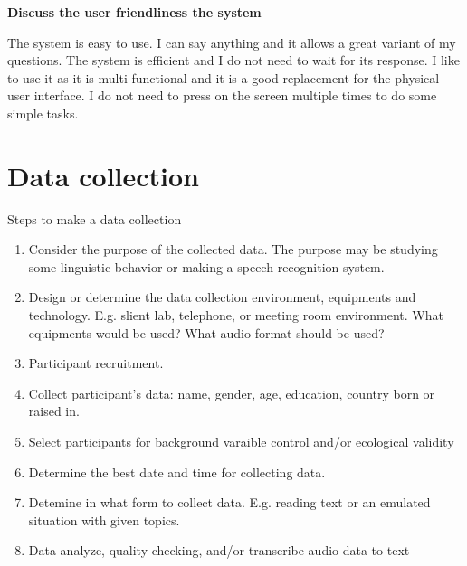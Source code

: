 \documentclass[12pt]{article}
\newenvironment{problem}[2][Problem]{\begin{trivlist}
\item[\hskip \labelsep {\bfseries #1}\hskip \labelsep {\bfseries #2.}]}{\end{trivlist}}
\begin{document}
\begin{problem}{3.3}
\noindent\textbf{Discuss the user friendliness the system}

    The system is easy to use. 
    I can say anything and it allows a great variant of my questions. 
    The system is efficient and I do not need to wait for its response. 
    I like to use it as it is multi-functional and it is a good replacement 
    for the physical user interface. 
    I do not need to press on the screen multiple times to do some simple tasks.

\end{problem}

\pagebreak
\section{Data collection}
\begin{problem}{4.1}
    Steps to make a data collection
    \begin{enumerate}
        \item Consider the purpose of the collected data. The purpose may be
        studying some linguistic behavior or making a speech recognition system.
        \item Design or determine the data collection environment, equipments and technology.
        E.g. slient lab, telephone, or meeting room environment.
        What equipments would be used? What audio format should be used?
        \item Participant recruitment.
        \item Collect participant's data: name, gender, age, education, country born or raised in.
        \item Select participants for background varaible control and/or ecological validity
        \item Determine the best date and time for collecting data.
        \item Detemine in what form to collect data.
        E.g. reading text or an emulated situation with given topics.
        \item Data analyze, quality checking, and/or transcribe audio data to text
    \end{enumerate}
\end{problem}
\end{document}
